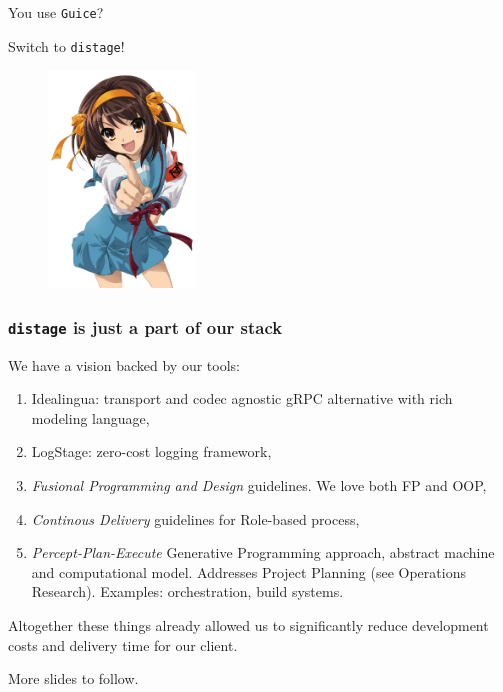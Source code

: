 \documentclass[usenames,dvipsnames]{beamer}
\newcommand{\distage}{\texttt{distage}\xspace}
\begin{document}
\begin{frame}
\begin{center}
\Huge
You use \texttt{Guice}?

Switch to \distage!

\begin{figure}
    \includegraphics[width=0.35\textwidth]{media/haruhi.jpg}
\end{figure}

\end{center}
\end{frame}


\begin{frame}
\frametitle{\distage is just a part of our stack}
We have a vision backed by our tools:
\begin{enumerate}
\item Idealingua: transport and codec agnostic gRPC alternative with rich modeling language,
\item LogStage: zero-cost logging framework,
\item \textit{Fusional Programming and Design} guidelines. We love both FP and OOP,
\item \textit{Continous Delivery} guidelines for Role-based process, 
\item \textit{Percept-Plan-Execute} Generative Programming approach, abstract machine and computational model.
Addresses Project Planning (see Operations Research). Examples: orchestration, build systems.

\end{enumerate}

Altogether these things already allowed us to significantly reduce development costs and
delivery time for our client.\newline

More slides to follow.
\end{frame}
\end{document}
